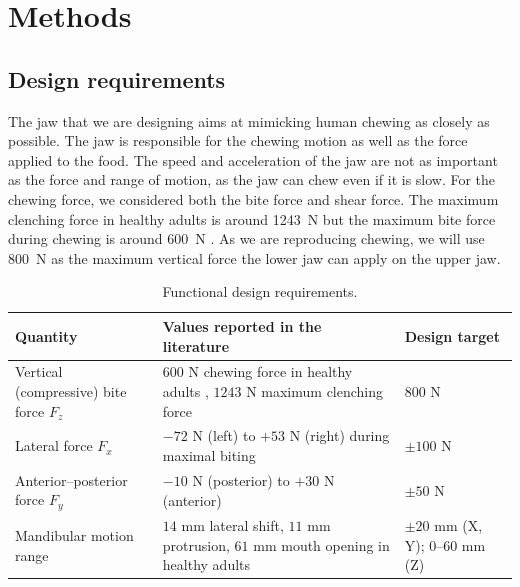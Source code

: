 \section{Methods}

\subsection{Design requirements}

The jaw that we are designing aims at mimicking human chewing as closely as possible. The jaw is responsible for the chewing motion as well as the force applied to the food.
The speed and acceleration of the jaw are not as important as the force and range of motion, as the jaw can chew even if it is slow.
For the chewing force, we considered both the bite force and shear force. The maximum clenching force in healthy adults is around \SI{1243}{\newton} \cite{max_clenching_force}
but the maximum bite force during chewing is around \SI{600}{\newton} \cite{chewing_force}. As we are reproducing chewing, we will use \SI{800}{\newton} as the maximum vertical force
the lower jaw can apply on the upper jaw.

\begin{table}[H]
  \centering
  \begin{tabular}{@{}L{4.2cm}L{6.4cm}L{4.2cm}@{}}
    \toprule
    \textbf{Quantity} & \textbf{Values reported in the literature} & \textbf{Design target} \\
    \midrule
    Vertical (compressive) bite force $F_{z}$ 
      & $600$ N chewing force in healthy adults \cite{chewing_force},\; $1243$ N maximum clenching force \cite{max_clenching_force}
      & $800$ N \\[2pt]
    
    \hline

    Lateral force $F_{x}$ 
      & $-72$ N (left) to $+53$ N (right) during maximal biting \cite{shear_force}
      & $\pm100$ N \\[2pt]
    \hline

    Anterior–posterior force $F_{y}$ 
      & $-10$ N (posterior) to $+30$ N (anterior) \cite{shear_force}
      & $\pm50$ N \\[2pt]
    \hline

    Mandibular motion range 
      & $14$ mm lateral shift, $11$ mm protrusion, $61$ mm mouth opening in healthy adults \cite{range_motion_required}
      & $\pm20$ mm (X, Y);\;\; $0$–$60$ mm (Z) \\[2pt]
  \bottomrule
  \end{tabular}
  \caption{Functional design requirements.}
  \label{tab:functional_criteria}
\end{table}


